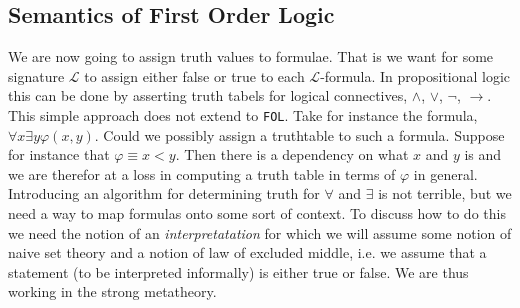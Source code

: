 \subsection{Semantics of First Order Logic}
We are now going to assign truth values to formulae. That is we want for some signature $\mathcal{L}$ to assign either false or true to each $\mathcal{L}$-formula. In propositional logic this can be done by asserting truth tabels for logical connectives, $\wedge$, $\vee$, $\neg$, $\to$. This simple approach does not extend to \verb|FOL|. Take for instance the formula, $\forall x \exists y \varphi(x,y)$. Could we possibly assign a truthtable to such a formula. Suppose for instance that $\varphi\equiv x<y$. Then there is a dependency on what $x$ and $y$ is and we are therefor at a loss in computing a truth table in terms of $\varphi$ in general. Introducing an algorithm for determining truth for $\forall$ and $\exists$ is not terrible, but we need a way to map formulas onto some sort of context. To discuss how to do this we need the notion of an \emph{interpretatation} for which we will assume some notion of naive set theory and a notion of law of excluded middle, i.e. we assume that a statement (to be interpreted informally) is either true or false. We are thus working in the strong metatheory.
